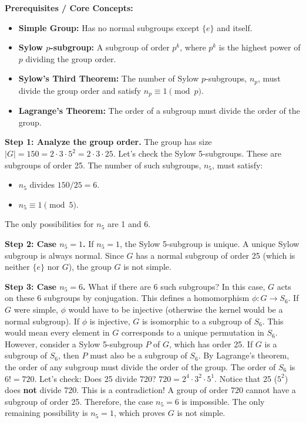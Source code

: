 \begin{solution}
\textbf{Prerequisites / Core Concepts:}
\begin{itemize}
    \item \textbf{Simple Group:} Has no normal subgroups except $\{e\}$ and itself.
    \item \textbf{Sylow $p$-subgroup:} A subgroup of order $p^k$, where $p^k$ is the highest power of $p$ dividing the group order.
    \item \textbf{Sylow's Third Theorem:} The number of Sylow $p$-subgroups, $n_p$, must divide the group order and satisfy $n_p \equiv 1 \pmod p$.
    \item \textbf{Lagrange's Theorem:} The order of a subgroup must divide the order of the group.
\end{itemize}

\textbf{Step 1: Analyze the group order.}
The group has size $|G| = 150 = 2 \cdot 3 \cdot 5^2 = 2 \cdot 3 \cdot 25$.
Let's check the Sylow 5-subgroups. These are subgroups of order 25.
The number of such subgroups, $n_5$, must satisfy:
\begin{itemize}
    \item $n_5$ divides $150/25 = 6$.
    \item $n_5 \equiv 1 \pmod 5$.
\end{itemize}
The only possibilities for $n_5$ are 1 and 6.

\textbf{Step 2: Case $n_5 = 1$.}
If $n_5 = 1$, the Sylow 5-subgroup is unique. A unique Sylow subgroup is always normal.
Since $G$ has a normal subgroup of order 25 (which is neither $\{e\}$ nor $G$), the group $G$ is not simple.

\textbf{Step 3: Case $n_5 = 6$.}
What if there are 6 such subgroups? In this case, $G$ acts on these 6 subgroups by conjugation.
This defines a homomorphism $\phi: G \to S_6$.
If $G$ were simple, $\phi$ would have to be injective (otherwise the kernel would be a normal subgroup).
If $\phi$ is injective, $G$ is isomorphic to a subgroup of $S_6$.
This would mean every element in $G$ corresponds to a unique permutation in $S_6$.
However, consider a Sylow 5-subgroup $P$ of $G$, which has order 25. If $G$ is a subgroup of $S_6$, then $P$ must also be a subgroup of $S_6$.
By Lagrange's theorem, the order of any subgroup must divide the order of the group.
The order of $S_6$ is $6! = 720$.
Let's check: Does 25 divide 720?
$720 = 2^4 \cdot 3^2 \cdot 5^1$. 
Notice that 25 ($5^2$) does \textbf{not} divide 720. 
This is a contradiction! A group of order 720 cannot have a subgroup of order 25.
Therefore, the case $n_5 = 6$ is impossible.
The only remaining possibility is $n_5 = 1$, which proves $G$ is not simple.
\end{solution}

